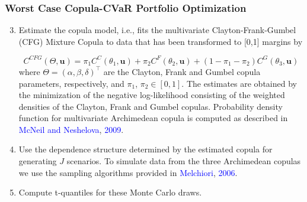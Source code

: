 \documentclass[pdf,9pt,xcolor=dvipsnames,hide notes]{beamer}
\begin{document}
\begin{frame}[label=frame5b]
	\frametitle{Worst Case Copula-CVaR Portfolio Optimization}
	
	\begin{enumerate}
		\setcounter{enumi}{2}
		\justifying
		\item Estimate the copula model, i.e., fits the multivariate Clayton-Frank-Gumbel
		(CFG) Mixture Copula to data that has been transformed to [0,1] margins by
		
		\begin{equation}
		C^{CFG}( \Theta ,\mathbf{u}) =\pi _{1}C^{C}( \theta _{1},\mathbf{u}) +\pi
		_{2}C^{F}( \theta _{2},\mathbf{u}) +(1-\pi _{1}-\pi _{2}) C^{G}( \theta _{3},%
		\mathbf{u})
		\end{equation}
		where $\Theta=\left(\alpha,\beta,\delta\right)^{\top }$ are the Clayton,
		Frank and Gumbel copula parameters, respectively, and $\pi_{1}$, $\pi_{2}
		\in [0,1]$. The estimates are obtained by the minimization of the negative
		log-likelihood consisting of the weighted densities of the Clayton, Frank
		and Gumbel copulas. Probability density function for multivariate
		Archimedean copula is computed as described in \textcolor{blue}{McNeil and Neshelova}, \textcolor{blue}{2009}.
		
		\vspace{0.3cm}

		\item Use
		the dependence structure determined by the estimated copula for generating $%
		J $ scenarios. To simulate data from the three Archimedean copulas we use
		the sampling algorithms provided in \textcolor{blue}{Melchiori}, \textcolor{blue}{2006}.
		
		
		\vspace{0.3cm}
		
		\item Compute
		t-quantiles for these Monte Carlo draws. 
		
		\end{enumerate}
	
\end{frame}
\end{document}
